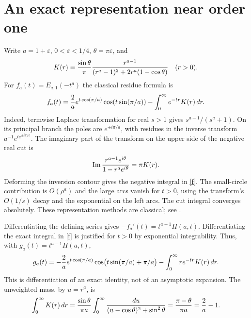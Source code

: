 \documentclass[11pt]{article}
\begin{document}
\section*{An exact representation near order one}
Write $a=1+\varepsilon$, $0<\varepsilon<1/4$,
$\theta=\pi\varepsilon$, and
\[
 K(r)={\sin\theta\over\pi}
 {r^{a-1}\over (r^a-1)^2+2r^a(1-\cos\theta)}\quad(r>0).
\]
For $f_a(t)=E_{a,1}(-t^a)$ the classical residue formula is
\begin{equation}\label{f}
 f_a(t)={2\over a}e^{t\cos(\pi/a)}\cos(t\sin(\pi/a))
             -\int_0^\infty e^{-tr}K(r)\,dr.
\end{equation}
Indeed, termwise Laplace transformation for real $s>1$ gives
$s^{a-1}/(s^a+1)$. On its principal branch the poles are
$e^{\pm i\pi/a}$, with residues in the inverse transform
$a^{-1}e^{t e^{\pm i\pi/a}}$. The imaginary part of the transform
on the upper side of the negative real cut is
\[
 \operatorname{Im}{r^{a-1}e^{i\theta}\over1-r^ae^{i\theta}}
       =\pi K(r).
\]
Deforming the inversion contour gives the negative integral in
\eqref{f}. The small-circle contribution is $O(\rho^a)$ and the
large arcs vanish for $t>0$, using the transform's $O(1/s)$ decay
and the exponential on the left arcs. The cut integral converges
absolutely. These representation methods are classical; see
\cite{Hanneken,Paris}.

Differentiating the defining series gives
$-f_a'(t)=t^{a-1}H(a,t)$. Differentiating the exact integral in
\eqref{f} is justified for $t>0$ by exponential integrability.
Thus, with $g_a(t)=t^{a-1}H(a,t)$,
\begin{equation}\label{g}
 g_a(t)=-{2\over a}e^{t\cos(\pi/a)}
       \cos\bigl(t\sin(\pi/a)+\pi/a\bigr)
             -\int_0^\infty r e^{-tr}K(r)\,dr.
\end{equation}
This is differentiation of an exact identity, not of an asymptotic
expansion. The unweighted mass, by $u=r^a$, is
\begin{equation}\label{mass}
 \int_0^\infty K(r)\,dr
 ={\sin\theta\over\pi a}\int_0^\infty
 {du\over(u-\cos\theta)^2+\sin^2\theta}
 ={\pi-\theta\over\pi a}={2\over a}-1.
\end{equation}
\end{document}
